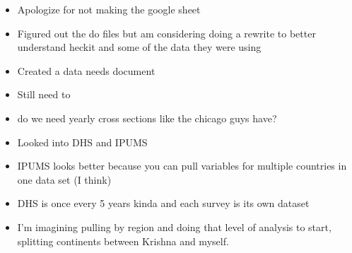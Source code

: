
\let\counterwithout\relax
\let\counterwithin\relax
{}


\begin{itemize}
\item Apologize for not making the google sheet
\item Figured out the do files but am considering doing a rewrite to better understand heckit and some of the data they were using
\item Created a data needs document
\item Still need to 
\item do we need yearly cross sections like the chicago guys have?
\item Looked into DHS and IPUMS
\item IPUMS looks better because you can pull variables for multiple countries in one data set (I think)
\item DHS is once every 5 years kinda and each survey is its own dataset
\item I'm imagining pulling by region and doing that level of analysis to start, splitting continents between Krishna and myself.
\end{itemize}

